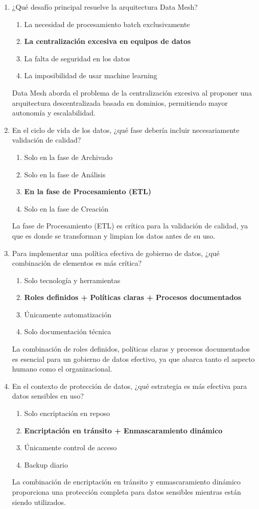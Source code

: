 \documentclass[12pt]{article}
\begin{document}
\begin{enumerate}[label=\arabic*.]
\item ¿Qué desafío principal resuelve la arquitectura Data Mesh?
\begin{enumerate}
    \item La necesidad de procesamiento batch exclusivamente
    \item \textbf{La centralización excesiva en equipos de datos}
    \item La falta de seguridad en los datos
    \item La imposibilidad de usar machine learning
\end{enumerate}
Data Mesh aborda el problema de la centralización excesiva al proponer una arquitectura descentralizada basada en dominios, permitiendo mayor autonomía y escalabilidad.

\item En el ciclo de vida de los datos, ¿qué fase debería incluir necesariamente validación de calidad?
\begin{enumerate}
    \item Solo en la fase de Archivado
    \item Solo en la fase de Análisis
    \item \textbf{En la fase de Procesamiento (ETL)}
    \item Solo en la fase de Creación
\end{enumerate}
La fase de Procesamiento (ETL) es crítica para la validación de calidad, ya que es donde se transforman y limpian los datos antes de su uso.

\item Para implementar una política efectiva de gobierno de datos, ¿qué combinación de elementos es más crítica?
\begin{enumerate}
    \item Solo tecnología y herramientas
    \item \textbf{Roles definidos + Políticas claras + Procesos documentados}
    \item Únicamente automatización
    \item Solo documentación técnica
\end{enumerate}
La combinación de roles definidos, políticas claras y procesos documentados es esencial para un gobierno de datos efectivo, ya que abarca tanto el aspecto humano como el organizacional.

\item En el contexto de protección de datos, ¿qué estrategia es más efectiva para datos sensibles en uso?
\begin{enumerate}
    \item Solo encriptación en reposo
    \item \textbf{Encriptación en tránsito + Enmascaramiento dinámico}
    \item Únicamente control de acceso
    \item Backup diario
\end{enumerate}
La combinación de encriptación en tránsito y enmascaramiento dinámico proporciona una protección completa para datos sensibles mientras están siendo utilizados.


\end{enumerate}
\end{document}
